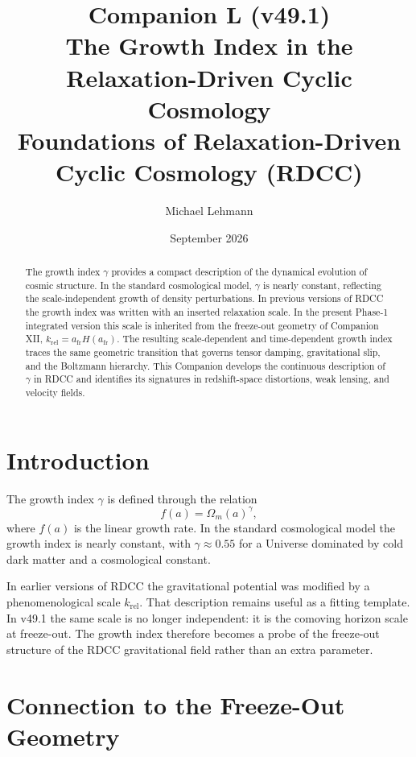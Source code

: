 \documentclass[11pt,a4paper]{article}
\title{\textbf{Companion L (v49.1)}\\[0.2cm]
\textbf{The Growth Index in the Relaxation-Driven Cyclic Cosmology}\\[0.2cm]
\large Foundations of Relaxation-Driven Cyclic Cosmology (RDCC)}
\author[1]{Michael Lehmann}
\affil[1]{\small Independent Researcher, Relaxation-Driven Cyclic Cosmology (RDCC)\\
\texttt{mi.lehmann@gmx.de}}
\date{September 2026}
\begin{document}
\maketitle

\begin{abstract}
The growth index \(\gamma\) provides a compact description of the dynamical
evolution of cosmic structure. In the standard cosmological model, \(\gamma\)
is nearly constant, reflecting the scale-independent growth of density
perturbations. In previous versions of RDCC the growth index was written with
an inserted relaxation scale. In the present Phase-1 integrated version this
scale is inherited from the freeze-out geometry of Companion XII,
\(k_{\mathrm{rel}}=a_{\mathrm{fr}}H(a_{\mathrm{fr}})\). The resulting
scale-dependent and time-dependent growth index traces the same geometric
transition that governs tensor damping, gravitational slip, and the Boltzmann
hierarchy. This Companion develops the continuous description of \(\gamma\) in
RDCC and identifies its signatures in redshift-space distortions, weak lensing,
and velocity fields.
\end{abstract}

\tableofcontents
\newpage

\section{Introduction}

The growth index \(\gamma\) is defined through the relation
\begin{equation}
  f(a)
  =
  \Omega_{m}(a)^{\gamma},
\end{equation}
where \(f(a)\) is the linear growth rate. In the standard cosmological model
the growth index is nearly constant, with \(\gamma\approx 0.55\) for a Universe
dominated by cold dark matter and a cosmological constant.

In earlier versions of RDCC the gravitational potential was modified by a
phenomenological scale \(k_{\mathrm{rel}}\). That description remains useful as
a fitting template. In v49.1 the same scale is no longer independent: it is
the comoving horizon scale at freeze-out. The growth index therefore becomes a
probe of the freeze-out structure of the RDCC gravitational field rather than
an extra parameter.

\section{Connection to the Freeze-Out Geometry}
\end{document}
